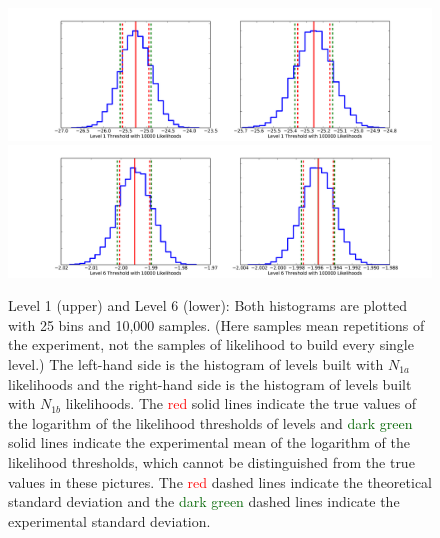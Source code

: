 \documentclass[letterpaper, preprint]{aastex}
\begin{document}
\begin{figure}[h]
 \includegraphics[width=0.99\linewidth]{level1.pdf}\\
 \includegraphics[width=0.99\linewidth]{level6.pdf}
 \caption{Level 1 (upper) and Level 6 (lower): Both histograms are plotted with 25 bins and 10,000 samples. (Here samples mean repetitions of the experiment, not the samples of likelihood to build every single level.) The left-hand side is the histogram of levels built with $N_{1a}$ likelihoods and the right-hand side is the histogram of levels built with $N_{1b}$ likelihoods. The \textcolor{red}{red} solid lines indicate the true values of the logarithm of the likelihood thresholds of levels and \textcolor{darkgreen}{dark green} solid lines indicate the experimental mean of the logarithm of the likelihood thresholds, which cannot be distinguished from the true values in these pictures. The \textcolor{red}{red} dashed lines indicate the theoretical standard deviation and the \textcolor{darkgreen}{dark green} dashed lines indicate the experimental standard deviation.}
 \label{fig:level1-6}
\end{figure}
\end{document}
